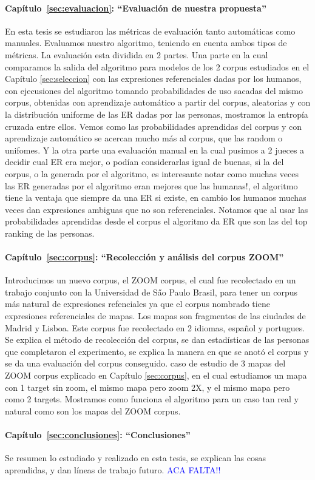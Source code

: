 \paragraph{Cap\'itulo~\ref{sec:evaluacion}: ``Evaluaci\'on de nuestra propuesta''} En esta tesis se estudiaron las m\'etricas de evaluaci\'on tanto autom\'aticas como manuales. Evaluamos nuestro algoritmo, teniendo en cuenta ambos tipos de m\'etricas. La evaluaci\'on esta dividida en 2 partes. Una parte en la cual comparamos la salida del algoritmo para modelos de los 2 corpus estudiados en el Cap\'itulo \ref{sec:seleccion} con las expresiones referenciales dadas por los humanos, con ejecusiones del algoritmo tomando probabilidades de uso sacadas del mismo corpus, obtenidas con aprendizaje autom\'atico a partir del corpus, aleatorias y con la distribuci\'on uniforme de las ER dadas por las personas, mostramos la entrop\'ia cruzada entre ellos. Vemos como las probabilidades aprendidas del corpus y con aprendizaje autom\'atico se acercan mucho m\'as al corpus, que las random o unifomes. Y la otra parte una evaluaci\'on manual en la cual pusimos a 2 jueces a decidir cual ER era mejor, o pod\'ian considerarlas igual de buenas, si la del corpus, o la generada por el algoritmo, es interesante notar como muchas veces las ER generadas por el algoritmo eran mejores que las humanas!, el algoritmo tiene la ventaja que siempre da una ER si existe, en cambio los humanos muchas veces dan expresiones ambiguas que no son referenciales. Notamos que al usar las probabilidades aprendidas desde el corpus el algoritmo da ER que son las del top ranking de las personas.

\paragraph{Cap\'itulo~\ref{sec:corpus}: ``Recolecci\'on y an\'alisis del corpus ZOOM''} Introducimos un nuevo corpus, el ZOOM corpus, el cual fue recolectado en un trabajo conjunto con la Universidad de S\H ao Paulo Brasil, para tener un corpus m\'as natural de expresiones refenciales ya que el corpus nombrado tiene expresiones referenciales de mapas. Los mapas son fragmentos de las ciudades de Madrid y Lisboa. Este corpus fue recolectado en 2 idiomas, espa\~nol y portugues. Se explica el m\'etodo de recolecci\'on del corpus, se dan estad\'isticas de las personas que completaron el experimento, se explica la manera en que se anot\'o el corpus y se da una evaluaci\'on del corpus conseguido. caso de estudio de 3 mapas del ZOOM corpus explicado en Cap\'itulo \ref{sec:corpus}, en el cual estudiamos un mapa con 1 target sin zoom, el mismo mapa pero zoom 2X, y el mismo mapa pero como 2 targets. Mostramos como funciona el algoritmo para un caso tan real y natural como son los mapas del ZOOM corpus. 


\paragraph{Cap\'itulo~\ref{sec:conclusiones}: ``Conclusiones''} Se resumen lo estudiado y realizado en esta tesis, se explican las cosas aprendidas, y dan l\'ineas de trabajo futuro. \textcolor{blue}{ACA FALTA!! }

